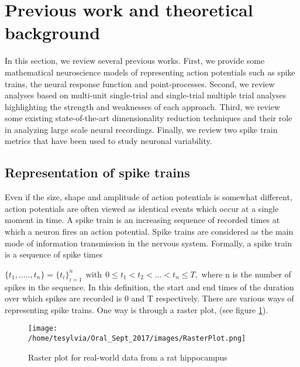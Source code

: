 
\section{Previous work and theoretical background}
In this section, we review several previous works.
First, we provide some mathematical neuroscience models of representing action potentials such as spike trains, the neural response function and point-processes. Second, we review analyses based on multi-unit single-trial and single-trial multiple trial analyses highlighting the strength and weaknesses of each approach. Third, we review some existing state-of-the-art dimensionality
reduction techniques and their role in analyzing large scale neural recordings.
Finally, we review two spike train metrics that have been used to study neuronal
variability.

\subsection{Representation of spike trains}
Even if the size, shape and amplitude of action potentials is somewhat different,
action potentials are often viewed as identical events which occur at a single moment in time. A spike train is an increasing sequence of recorded times at which a neuron fires an action potential. Spike trains are considered as the main mode of information transmission in the nervous system.
Formally, a spike train is a sequence of spike times

$\displaystyle  \{t_{1}, ....., t_{n} \} = \{t_{i}\}_{i=1}^{n} \ \ 
 \text{with} \ \  0 \leq t_{1} < t_{2}< ... < t_{n} \leq T,$
 where n is the number of spikes in the sequence.
In this definition, the start and end times of the duration over which spikes are recorded is 0 and T respectively. There are various ways of representing spike trains. One way is through a raster plot, (see figure \ref{fig:Raster}).\\
 
 \begin{figure}[H]
  \centering
    \texttt{[image: /home/tesylvia/Oral\_Sept\_2017/images/RasterPlot.png]}
     \caption{Raster plot for real-world data from a rat hippocampus}
      \label{fig:Raster}
\end{figure}

